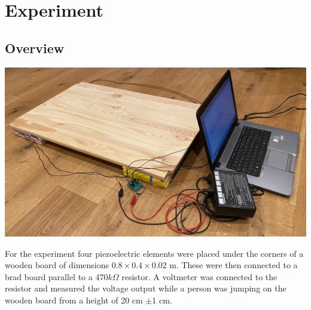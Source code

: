 \chapter{Experiment}

\section{Overview}

\begin{minipage}{0.33\textwidth}
    \includegraphics[width=\textwidth]{./Figure_6.jpg}
    \label{fig:Experiment}
\end{minipage}
\begin{minipage}{0.66\textwidth}
    For the experiment four piezoelectric elements were placed under the corners of a wooden board of dimensions $0.8 \times 0.4 \times 0.02$ m. These were then connected to a brad board parallel to a $470k\Omega$ resistor. A voltmeter was connected to the resistor and measured the voltage output while a person was jumping on the wooden board from a height of 20 cm $\pm 1$ cm.\\
\end{minipage}

